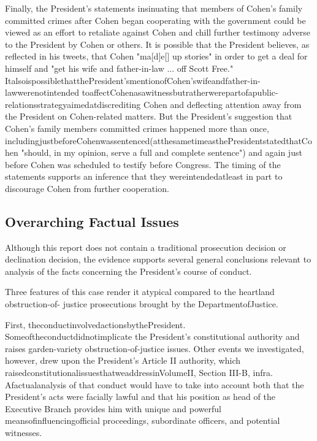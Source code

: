 {Finally, the President's statements insinuating that members of Cohen's family committed crimes after Cohen began cooperating with the government could be viewed as an effort to retaliate against Cohen and chill further testimony adverse to the President by Cohen or others.
It is possible that the President believes, as reflected in his tweets, that Cohen "ma[d]e[] up stories" in order to get a deal for himself and "get his wife and father-in-law ... off Scott Free." ItalsoispossiblethatthePresident'smentionofCohen'swifeandfather-in-lawwerenotintended toaffectCohenasawitnessbutratherwerepartofapublic-relationsstrategyaimedatdiscrediting Cohen and deflecting attention away from the President on Cohen-related matters.
But the President's suggestion that Cohen's family members committed crimes happened more than once, includingjustbeforeCohenwassentenced(atthesametimeasthePresidentstatedthatCohen "should, in my opinion, serve a full and complete sentence") and again just before Cohen was scheduled to testify before Congress.
The timing of the statements supports an inference that they wereintendedatleast in part to discourage Cohen from further cooperation.

\subsection{Overarching Factual Issues}

Although this report does not contain a traditional prosecution decision or declination decision, the evidence supports several general conclusions relevant to analysis of the facts concerning the President's course of conduct.

Three features of this case render it atypical compared to the heartland obstruction-of- justice prosecutions brought by the DepartmentofJustice.

First, theconductinvolvedactionsbythePresident.
Someoftheconductdidnotimplicate the President's constitutional authority and raises garden-variety obstruction-of-justice issues.
Other events we investigated, however, drew upon the President's Article II authority, which raisedconstitutionalissuesthatweaddressinVolumeII, Section III-B, infra.
Afactualanalysis of that conduct would have to take into account both that the President's acts were facially lawful and that his position as head of the Executive Branch provides him with unique and powerful meansofinfluencingofficial proceedings, subordinate officers, and potential witnesses.

}
